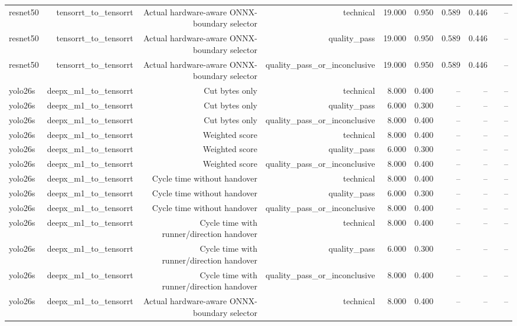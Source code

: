 \begin{table}[t]
\begin{tabular}{lrrrrrrrrr}
resnet50 & tensorrt\_to\_tensorrt & Actual hardware-aware ONNX-boundary selector & technical & 19.000 & 0.950 & 0.589 & 0.446 &  & -- \\
resnet50 & tensorrt\_to\_tensorrt & Actual hardware-aware ONNX-boundary selector & quality\_pass & 19.000 & 0.950 & 0.589 & 0.446 &  & -- \\
resnet50 & tensorrt\_to\_tensorrt & Actual hardware-aware ONNX-boundary selector & quality\_pass\_or\_inconclusive & 19.000 & 0.950 & 0.589 & 0.446 &  & -- \\
yolo26s & deepx\_m1\_to\_tensorrt & Cut bytes only & technical & 8.000 & 0.400 & -- & -- &  & -- \\
yolo26s & deepx\_m1\_to\_tensorrt & Cut bytes only & quality\_pass & 6.000 & 0.300 & -- & -- &  & -- \\
yolo26s & deepx\_m1\_to\_tensorrt & Cut bytes only & quality\_pass\_or\_inconclusive & 8.000 & 0.400 & -- & -- &  & -- \\
yolo26s & deepx\_m1\_to\_tensorrt & Weighted score & technical & 8.000 & 0.400 & -- & -- &  & -- \\
yolo26s & deepx\_m1\_to\_tensorrt & Weighted score & quality\_pass & 6.000 & 0.300 & -- & -- &  & -- \\
yolo26s & deepx\_m1\_to\_tensorrt & Weighted score & quality\_pass\_or\_inconclusive & 8.000 & 0.400 & -- & -- &  & -- \\
yolo26s & deepx\_m1\_to\_tensorrt & Cycle time without handover & technical & 8.000 & 0.400 & -- & -- &  & -- \\
yolo26s & deepx\_m1\_to\_tensorrt & Cycle time without handover & quality\_pass & 6.000 & 0.300 & -- & -- &  & -- \\
yolo26s & deepx\_m1\_to\_tensorrt & Cycle time without handover & quality\_pass\_or\_inconclusive & 8.000 & 0.400 & -- & -- &  & -- \\
yolo26s & deepx\_m1\_to\_tensorrt & Cycle time with runner/direction handover & technical & 8.000 & 0.400 & -- & -- &  & -- \\
yolo26s & deepx\_m1\_to\_tensorrt & Cycle time with runner/direction handover & quality\_pass & 6.000 & 0.300 & -- & -- &  & -- \\
yolo26s & deepx\_m1\_to\_tensorrt & Cycle time with runner/direction handover & quality\_pass\_or\_inconclusive & 8.000 & 0.400 & -- & -- &  & -- \\
yolo26s & deepx\_m1\_to\_tensorrt & Actual hardware-aware ONNX-boundary selector & technical & 8.000 & 0.400 & -- & -- &  & -- \\

\end{tabular}
\end{table}
